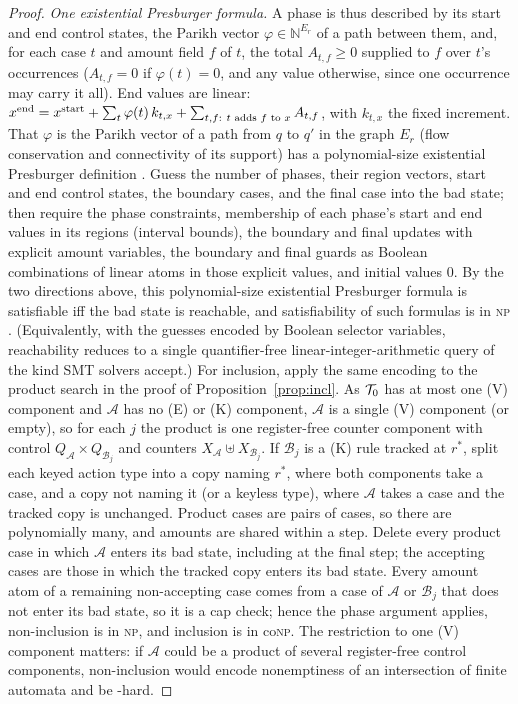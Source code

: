 \begin{proof}
\emph{One existential Presburger formula.} A phase is thus described by its start and end control states, the Parikh vector
$\varphi\in\mathbb N^{E_r}$ of a path between them, and, for each case $t$ and amount field $f$ of $t$, the total $A_{t,f}\ge 0$ supplied
to $f$ over $t$'s occurrences ($A_{t,f}=0$ if $\varphi(t)=0$, and any value otherwise, since one occurrence may carry it all). End
values are linear: $x^{\rm end}=x^{\rm start}+\sum_t\varphi(t)\,k_{t,x}+\sum_{t,f:\ t\text{ adds }f\text{ to }x}A_{t,f}$, with $k_{t,x}$
the fixed increment. That $\varphi$ is the Parikh vector of a path from $q$ to $q'$ in the graph $E_r$ (flow conservation and
connectivity of its support) has a polynomial-size existential Presburger definition \citep{verma2005parikh}. Guess the number of
phases, their region vectors, start and end control states, the boundary cases, and the final case into the bad state; then require
the phase constraints, membership of each phase's start and end values in its regions (interval bounds), the boundary and final
updates with explicit amount variables, the boundary and final guards as Boolean combinations of linear atoms in those explicit values,
and initial values $0$. By the two directions above, this polynomial-size existential Presburger formula is satisfiable iff the bad
state is reachable, and satisfiability of such formulas is in \textsc{np} \citep{scarpellini1984presburger}. (Equivalently, with the guesses encoded by Boolean selector
variables, reachability reduces to a single quantifier-free linear-integer-arithmetic query of the kind SMT solvers accept.) For inclusion, apply the same encoding to the product
search in the proof of Proposition~\ref{prop:incl}. As $\mathcal{T}_0$ has at most one (V) component and $\mathcal A$ has no (E) or (K) component,
$\mathcal A$ is a single (V) component (or empty), so for each $j$ the product is one register-free counter component with control
$Q_{\mathcal A}\times Q_{\mathcal B_j}$ and counters $X_{\mathcal A}\uplus X_{\mathcal B_j}$. If $\mathcal B_j$ is a (K) rule tracked at $r^\ast$, split each
keyed action type into a copy naming $r^\ast$, where both components take a case, and a copy not naming it (or a keyless type), where
$\mathcal A$ takes a case and the tracked copy is unchanged. Product cases are pairs of cases, so there are polynomially many, and amounts
are shared within a step. Delete every product case in which $\mathcal A$ enters its bad state, including at the final step; the
accepting cases are those in which the tracked copy enters its bad state. Every amount atom of a remaining non-accepting case comes from a
case of $\mathcal A$ or $\mathcal B_j$ that does not enter its bad state, so it is a cap check; hence the phase argument applies,
non-inclusion is in \textsc{np}, and inclusion is in co\textsc{np}. The restriction to one (V) component matters: if $\mathcal A$ could be a product of several
register-free control components, non-inclusion would encode nonemptiness of an intersection of finite automata and be \PSPACE-hard.


\end{proof}
